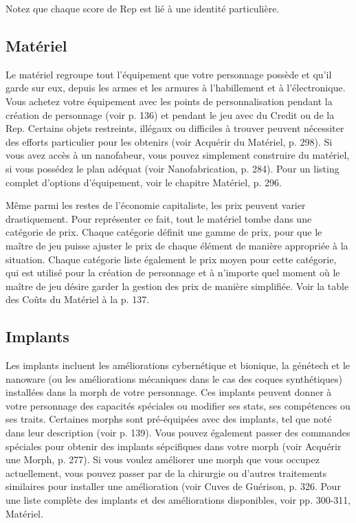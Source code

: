 Notez que chaque score de Rep est lié à une identité particulière. 

\subsection{Matériel} \label{sec:gear} 

Le matériel regroupe tout l'équipement que votre personnage possède et qu'il garde sur eux, depuis les armes et les armures à l'habillement et à l'électronique. Vous achetez votre équipement avec les points de personnalisation pendant la création de personnage (voir p. 136) et pendant le jeu avec du Credit ou de la Rep. Certains objets restreints, illégaux ou difficiles à trouver peuvent nécessiter des efforts particulier pour les obtenirs (voir Acquérir du Matériel, p. 298). Si vous avez accès à un nanofabeur, vous pouvez simplement construire du matériel, si vous possédez le plan adéquat (voir Nanofabrication, p. 284). Pour un listing complet d'options d'équipement, voir le chapitre Matériel, p. 296. 

Même parmi les restes de l'économie capitaliste, les prix peuvent varier drastiquement. Pour représenter ce fait, tout le matériel tombe dans une catégorie de prix. Chaque catégorie définit une gamme de prix, pour que le maître de jeu puisse ajuster le prix de chaque élément de manière appropriée à la situation. Chaque catégorie liste également le prix moyen pour cette catégorie, qui est utilisé pour la création de personnage et à n'importe quel moment où le maître de jeu désire garder la gestion des prix de manière simplifiée. Voir la table des Coûts du Matériel à la p. 137. 

\subsection{Implants} \label{sec:implants} 

Les implants incluent les améliorations cybernétique et bionique, la génétech et le nanoware (ou les améliorations mécaniques dans le cas des coques synthétiques) installées dans la morph de votre personnage. Ces implants peuvent donner à votre personnage des capacités spéciales ou modifier ses stats, ses compétences ou ses traits. Certaines morphs sont pré-équipées avec des implants, tel que noté dans leur description (voir p. 139). Vous pouvez également passer des commandes spéciales pour obtenir des implants sépcifiques dans votre morph (voir Acquérir une Morph, p. 277). Si vous voulez améliorer une morph que vous occupez actuellement, vous pouvez passer par de la chirurgie ou d'autres traitements similaires pour installer une amélioration (voir Cuves de Guérison, p. 326. Pour une liste complète des implants et des améliorations disponibles, voir pp. 300-311, Matériel. 

